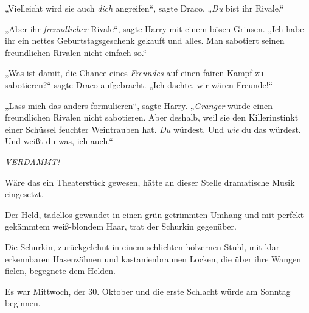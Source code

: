 „Vielleicht wird sie auch \emph{dich} angreifen“, sagte Draco. „\emph{Du} bist ihr Rivale.“

„Aber ihr \emph{freundlicher} Rivale“, sagte Harry mit einem bösen Grinsen. „Ich habe ihr ein nettes Geburtstagsgeschenk gekauft und alles. Man sabotiert seinen freundlichen Rivalen nicht einfach so.“

„Was ist damit, die Chance eines \emph{Freundes} auf einen fairen Kampf zu sabotieren?“ sagte Draco aufgebracht. „Ich dachte, wir wären Freunde!“

„Lass mich das anders formulieren“, sagte Harry. „\emph{Granger} würde einen freundlichen Rivalen nicht sabotieren. Aber deshalb, weil sie den Killerinstinkt einer Schüssel feuchter Weintrauben hat. \emph{Du} würdest. Und \emph{wie} du das würdest. Und weißt du was, ich auch.“

\emph{VERDAMMT!}

\later

Wäre das ein Theaterstück gewesen, hätte an dieser Stelle dramatische Musik eingesetzt.

Der Held, tadellos gewandet in einen grün-getrimmten Umhang und mit perfekt gekämmtem weiß-blondem Haar, trat der Schurkin gegenüber.

Die Schurkin, zurückgelehnt in einem schlichten hölzernen Stuhl, mit klar erkennbaren Hasenzähnen und kastanienbraunen Locken, die über ihre Wangen fielen, begegnete dem Helden.

Es war Mittwoch, der 30. Oktober und die erste Schlacht würde am Sonntag beginnen.

